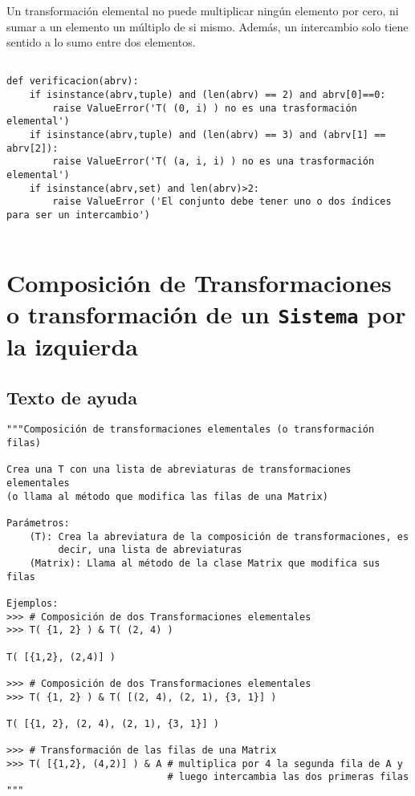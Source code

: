 \documentclass[11pt]{report}
\begin{document}
Un transformación elemental no puede multiplicar ningún elemento por
cero, ni sumar a un elemento un múltiplo de si mismo. Además, un
intercambio solo tiene sentido a lo sumo entre dos elementos.
\begin{verbatim}

def verificacion(abrv):
    if isinstance(abrv,tuple) and (len(abrv) == 2) and abrv[0]==0:
        raise ValueError('T( (0, i) ) no es una trasformación elemental')
    if isinstance(abrv,tuple) and (len(abrv) == 3) and (abrv[1] == abrv[2]):
        raise ValueError('T( (a, i, i) ) no es una trasformación elemental')
    if isinstance(abrv,set) and len(abrv)>2:
        raise ValueError ('El conjunto debe tener uno o dos índices para ser un intercambio')
    
\end{verbatim}

\section{Composición de Transformaciones o transformación de un \texttt{Sistema} por la izquierda}
\label{sec:org9771185}

\subsection{Texto de ayuda}
\label{sec:orgb7b8638}

\begin{verbatim}
"""Composición de transformaciones elementales (o transformación filas)

Crea una T con una lista de abreviaturas de transformaciones elementales
(o llama al método que modifica las filas de una Matrix)

Parámetros:
    (T): Crea la abreviatura de la composición de transformaciones, es
         decir, una lista de abreviaturas
    (Matrix): Llama al método de la clase Matrix que modifica sus filas

Ejemplos:
>>> # Composición de dos Transformaciones elementales
>>> T( {1, 2} ) & T( (2, 4) )

T( [{1,2}, (2,4)] )

>>> # Composición de dos Transformaciones elementales
>>> T( {1, 2} ) & T( [(2, 4), (2, 1), {3, 1}] )

T( [{1, 2}, (2, 4), (2, 1), {3, 1}] )

>>> # Transformación de las filas de una Matrix
>>> T( [{1,2}, (4,2)] ) & A # multiplica por 4 la segunda fila de A y
                            # luego intercambia las dos primeras filas
"""        

\end{verbatim}
\end{document}
